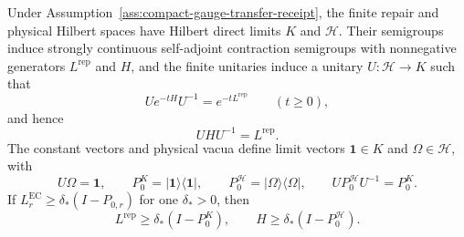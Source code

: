 \begin{theorem}
\label{thm:continuum-transfer-identification}
Under Assumption~\ref{ass:compact-gauge-transfer-receipt}, the finite repair and physical Hilbert
spaces have Hilbert direct limits \(K\) and \(\mathcal H\). Their semigroups induce strongly
continuous self-adjoint contraction semigroups with nonnegative generators
\(L^{\mathrm{rep}}\) and \(H\), and the finite unitaries induce a unitary
\(U:\mathcal H\to K\) such that
\[
U e^{-tH}U^{-1}=e^{-tL^{\mathrm{rep}}}\qquad(t\ge 0),
\]
and hence
\[
UHU^{-1}=L^{\mathrm{rep}}.
\]
The constant vectors and physical vacua define limit vectors
\(\mathbf 1\in K\) and \(\Omega\in\mathcal H\), with
\[
U\Omega=\mathbf 1,
\qquad
P_0^K=|\mathbf 1\rangle\langle\mathbf 1|,
\qquad
P_0^{\mathcal H}=|\Omega\rangle\langle\Omega|,
\qquad
UP_0^{\mathcal H}U^{-1}=P_0^K.
\]
If \(L_r^{\mathrm{EC}}\ge \delta_*(I-P_{0,r})\) for one \(\delta_*>0\), then
\[
L^{\mathrm{rep}}\ge \delta_*(I-P_0^K),
\qquad
H\ge \delta_*(I-P_0^{\mathcal H}).
\]
\end{theorem}

